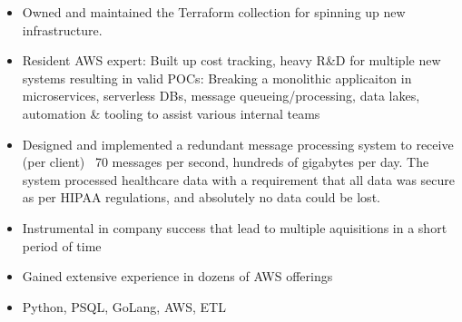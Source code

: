 \documentclass[10pt,a4paper]{altacv}
\begin{document}

\begin{fullwidth}
\makecvheader
\end{fullwidth}


\begin{itemize}
\item Owned and maintained the Terraform collection for spinning up new infrastructure.
\item Resident AWS expert: Built up cost tracking, heavy R\&D for multiple new systems resulting in valid POCs: Breaking a monolithic applicaiton in microservices, serverless DBs, message queueing/processing, data lakes, automation \& tooling to assist various internal teams
\item Designed and  implemented a redundant message processing system to receive (per client) ~70 messages per second, hundreds of gigabytes per day. The system processed healthcare data with a requirement that all data was secure as per HIPAA regulations, and absolutely no data could be lost.
\item Instrumental in company success that lead to multiple aquisitions in a short period of time
\item Gained extensive experience in dozens of AWS offerings
\item Python, PSQL, GoLang, AWS, ETL
\end{itemize}
\end{document}
